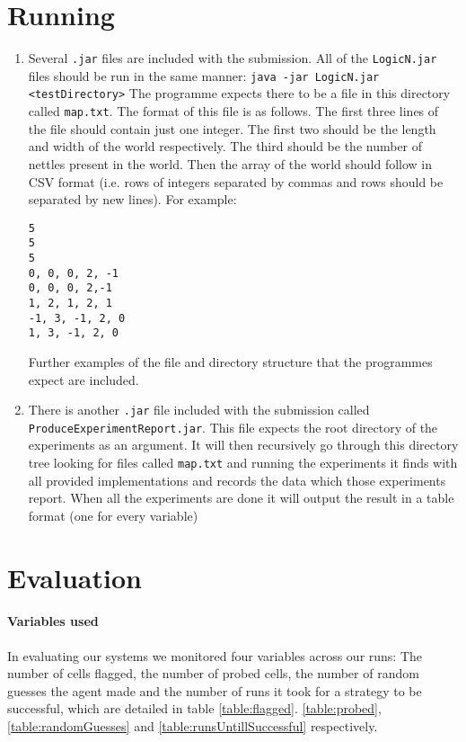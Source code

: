 \documentclass[british]{article}
\newcommand{\code}[1]{\texttt{#1}}
\begin{document}
\section{Running}
\label{running}
\begin{enumerate}
\item  Several \code{.jar} files are included with the submission. All of the \code{LogicN.jar} files should be run in the same manner: \code{java -jar LogicN.jar <testDirectory>} The programme expects there to be a file in this directory called \code{map.txt}. The format of this file is as follows. The first three lines of the file should contain just one integer. The first two should be the length and width of the world respectively. The third should be the number of nettles present in the world. Then the array of the world should follow in CSV format (i.e. rows of integers separated by commas and rows should be separated by new lines). For example: \begin{lstlisting}
5
5
5
0, 0, 0, 2, -1
0, 0, 0, 2,-1
1, 2, 1, 2, 1
-1, 3, -1, 2, 0
1, 3, -1, 2, 0
\end{lstlisting} Further examples of the file and directory structure that the programmes expect are included.
\item There is another \code{.jar} file included with the submission called \code{ProduceExperimentReport.jar}. This file expects the root directory of the experiments as an argument. It will then recursively go through this directory tree looking for files called \code{map.txt}  and running the experiments it finds with all provided implementations and records the data which those experiments report. When all the experiments are done it will output the result in a table format (one for every variable)  
\end{enumerate}
\section{Evaluation}
\label{evals}
\paragraph{Variables used} In evaluating our systems we monitored four variables across our runs: The number of cells flagged, the number of probed cells, the number of random guesses the agent made and the number of runs it took for a strategy to be successful, which are detailed in table \ref{table:flagged}. \ref{table:probed}, \ref{table:randomGuesses} and \ref{table:runsUntillSuccessful} respectively.
\end{document}
